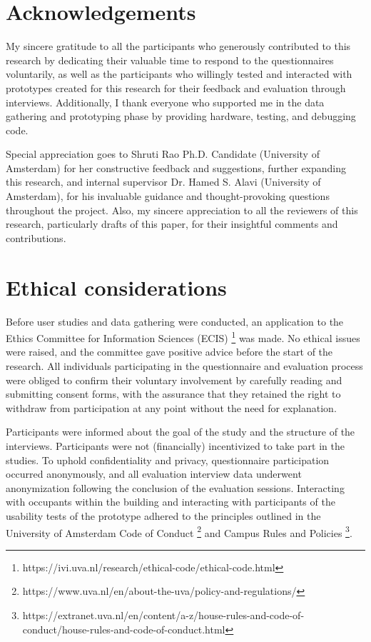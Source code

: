 \onecolumn

\appendix
\begin{appendices}

\section{Acknowledgements}
\label{appendix:acknowledgements}

My sincere gratitude to all the participants who generously contributed to this research by dedicating their valuable time to respond to the questionnaires voluntarily, as well as the participants who willingly tested and interacted with prototypes created for this research for their feedback and evaluation through interviews. Additionally, I thank everyone who supported me in the data gathering and prototyping phase by providing hardware, testing, and debugging code.

Special appreciation goes to Shruti Rao Ph.D. Candidate (University of Amsterdam) for her constructive feedback and suggestions, further expanding this research, and internal supervisor Dr. Hamed S. Alavi (University of Amsterdam), for his invaluable guidance and thought-provoking questions throughout the project. Also, my sincere appreciation to all the reviewers of this research, particularly drafts of this paper, for their insightful comments and contributions.

\section{Ethical considerations}
\label{appendix:ethical}

Before user studies and data gathering were conducted, an application to the Ethics Committee for Information Sciences (ECIS) \footnote{https://ivi.uva.nl/research/ethical-code/ethical-code.html} was made. No ethical issues were raised, and the committee gave positive advice before the start of the research. All individuals participating in the questionnaire and evaluation process were obliged to confirm their voluntary involvement by carefully reading and submitting consent forms, with the assurance that they retained the right to withdraw from participation at any point without the need for explanation.

Participants were informed about the goal of the study and the structure of the interviews. Participants were not (financially) incentivized to take part in the studies. To uphold confidentiality and privacy, questionnaire participation occurred anonymously, and all evaluation interview data underwent anonymization following the conclusion of the evaluation sessions. Interacting with occupants within the building and interacting with participants of the usability tests of the prototype adhered to the principles outlined in the University of Amsterdam Code of Conduct \footnote{https://www.uva.nl/en/about-the-uva/policy-and-regulations/} and Campus Rules and Policies \footnote{https://extranet.uva.nl/en/content/a-z/house-rules-and-code-of-conduct/house-rules-and-code-of-conduct.html}.


\end{appendices}
